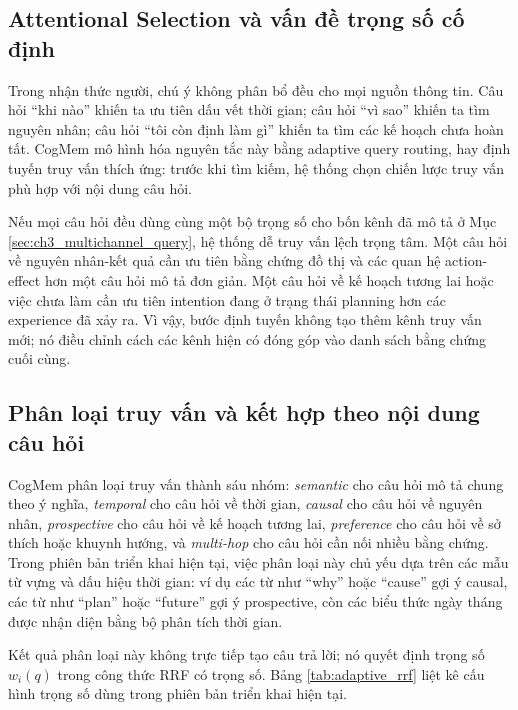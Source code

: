 \documentclass[../main.tex]{subfiles}
\begin{document}
\subsection{Attentional Selection và vấn đề trọng số cố định}

Trong nhận thức người, chú ý không phân bổ đều cho mọi nguồn thông tin. Câu hỏi ``khi nào'' khiến ta ưu tiên dấu vết thời gian; câu hỏi ``vì sao'' khiến ta tìm nguyên nhân; câu hỏi ``tôi còn định làm gì'' khiến ta tìm các kế hoạch chưa hoàn tất. CogMem mô hình hóa nguyên tắc này bằng adaptive query routing, hay định tuyến truy vấn thích ứng: trước khi tìm kiếm, hệ thống chọn chiến lược truy vấn phù hợp với nội dung câu hỏi.

Nếu mọi câu hỏi đều dùng cùng một bộ trọng số cho bốn kênh đã mô tả ở Mục \ref{sec:ch3_multichannel_query}, hệ thống dễ truy vấn lệch trọng tâm. Một câu hỏi về nguyên nhân-kết quả cần ưu tiên bằng chứng đồ thị và các quan hệ action-effect hơn một câu hỏi mô tả đơn giản. Một câu hỏi về kế hoạch tương lai hoặc việc chưa làm cần ưu tiên intention đang ở trạng thái planning hơn các experience đã xảy ra. Vì vậy, bước định tuyến không tạo thêm kênh truy vấn mới; nó điều chỉnh cách các kênh hiện có đóng góp vào danh sách bằng chứng cuối cùng.

\subsection{Phân loại truy vấn và kết hợp theo nội dung câu hỏi}

CogMem phân loại truy vấn thành sáu nhóm: \textit{semantic} cho câu hỏi mô tả chung theo ý nghĩa, \textit{temporal} cho câu hỏi về thời gian, \textit{causal} cho câu hỏi về nguyên nhân, \textit{prospective} cho câu hỏi về kế hoạch tương lai, \textit{preference} cho câu hỏi về sở thích hoặc khuynh hướng, và \textit{multi-hop} cho câu hỏi cần nối nhiều bằng chứng. Trong phiên bản triển khai hiện tại, việc phân loại này chủ yếu dựa trên các mẫu từ vựng và dấu hiệu thời gian: ví dụ các từ như ``why'' hoặc ``cause'' gợi ý causal, các từ như ``plan'' hoặc ``future'' gợi ý prospective, còn các biểu thức ngày tháng được nhận diện bằng bộ phân tích thời gian.

Kết quả phân loại này không trực tiếp tạo câu trả lời; nó quyết định trọng số $w_i(q)$ trong công thức RRF có trọng số. Bảng \ref{tab:adaptive_rrf} liệt kê cấu hình trọng số dùng trong phiên bản triển khai hiện tại.
\end{document}
